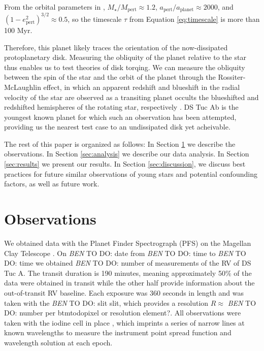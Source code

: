 \documentclass[twocolumn]{aastex62}
\newcommand{\todo}[3]{{\color{#2} \emph{#1} TO DO: #3}}
\newcommand{\btmtodo}[1]{\todo{BEN}{blue}{#1}}
\begin{document}
From the orbital parameters in \citet{Newton19}, ${M_\star}/{M_\textrm{pert}} \approx 1.2$, ${a_\textrm{pert}}/{a_\textrm{planet}} \approx 2000$, and $(1-e^2_\textrm{pert})^{3/2} \approx 0.5$, so the timescale $\tau$ from Equation \ref{eq:timescale} is more than 100 Myr. 

Therefore, this planet likely traces the orientation of the now-dissipated protoplanetary disk. 
Measuring the obliquity of the planet relative to the star thus enables us to test theories of disk torqing.
We can measure the obliquity between the spin of the star and the orbit of the planet through the Rossiter-McLaughlin effect, in which an apparent redshift and blueshift in the radial velocity of the star are observed as a transiting planet occults the blueshifted and redshifted hemispheres of the rotating star, respectively \citep{Rossiter24, McLaughlin24}.
DS Tuc Ab is the youngest known planet for which such an observation has been attempted, providing us the nearest test case to an undissipated disk yet acheivable.


The rest of this paper is organized as follows:
In Section \ref{sec:obs} we describe the observations.
In Section \ref{sec:analysis} we describe our data analysis.
In Section \ref{sec:results} we present our results.
In Section \ref{sec:discussion}, we discuss best practices for future similar observations of young stars and potential confounding factors, as well as future work.


\section{Observations}
\label{sec:obs}

We obtained data with the Planet Finder Spectrograph (PFS) on the Magellan Clay Telescope \citep{Crane06, Crane08, Crane10}. 
On \btmtodo{date} from \btmtodo{time} to \btmtodo{time} we obtained \btmtodo{number} of measurements of the RV of DS Tuc A. The transit duration is 190 minutes, meaning approximately 50\% of the data were obtained in transit while the other half provide information about the out-of-transit RV baseline. Each exposure was 360 seconds in length and was taken with the \btmtodo{slit} slit, which provides a resolution $R \approx$ \btmtodo{number} per btmtodo{pixel or resolution element?}. All observations were taken with the iodine cell in place \citep{Marcy92}, which imprints a series of narrow lines at known wavelengths to measure the instrument point spread function and wavelength solution at each epoch.
\end{document}
